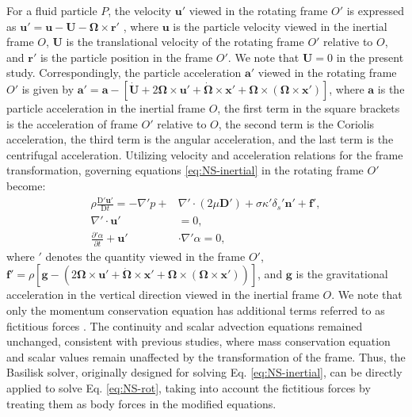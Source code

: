 \documentclass[final,3p,times,twocolumn,authoryear]{elsarticle}
\theoremstyle{definition}
\begin{document}
For a fluid particle $P$, the velocity $\mathbf{u}'$ viewed in the rotating frame $O'$ is expressed as $\mathbf{u}' = \mathbf{u} - \mathbf{U} - \mathbf{\Omega} \times \mathbf{r}'$ \citep{Kundu2015}, where $\mathbf{u}$ is the particle velocity viewed in the inertial frame $O$, $\mathbf{U}$ is the translational velocity of the rotating frame $O'$ relative to $O$, and $\mathbf{r}'$ is the particle position in the frame $O'$. We note that $\mathbf{U}=0$ in the present study. Correspondingly, the particle acceleration $\mathbf{a}'$ viewed in the rotating frame $O'$ is given by $\mathbf{a}' = \mathbf{a} - [\dot{\mathbf{U}} + 2\mathbf{\Omega}\times\mathbf{u}' + \dot{\mathbf{\Omega}}\times\mathbf{x}' + \mathbf{\Omega}\times(\mathbf{\Omega}\times\mathbf{x}')]$, where $\mathbf{a}$ is the particle acceleration in the inertial frame $O$, the first term in the square brackets is the acceleration of frame $O'$ relative to $O$, the second term is the Coriolis acceleration, the third term is the angular acceleration, and the last term is the centrifugal acceleration. Utilizing velocity and acceleration relations for the frame transformation, governing equations \eqref{eq:NS-inertial} in the rotating frame $O'$ become:
\begin{equation}
    \begin{split}
        \rho\frac{\mathrm{D}' \mathbf{u}'}{\mathrm{D} t} = -\nabla' p + & \nabla' \cdot \left( 2\mu\mathbf{D}'\right) + \sigma\kappa'\delta_s'\mathbf{n}' + \mathbf{f'}, \\
        \nabla' \cdot \mathbf{u}' & = 0, \\
        \frac{\partial' \alpha}{\partial t} + \mathbf{u}' & \cdot \nabla' \alpha = 0, \label{eq:NS-rot}
    \end{split}
\end{equation}
where $'$ denotes the quantity viewed in the frame $O'$, $\mathbf{f'} = \rho [\mathbf{g} - (2\mathbf{\Omega}\times\mathbf{u}' + \dot{\mathbf{\Omega}}\times\mathbf{x}' + \mathbf{\Omega} \times (\mathbf{\Omega} \times \mathbf{x}'))]$, and $\mathbf{g}$ is the gravitational acceleration in the vertical direction viewed in the inertial frame $O$. We note that only the momentum conservation equation has additional terms referred to as fictitious forces \citep{Kundu2015,Gledhill2016,Combrinck2017,Musehane2021}. The continuity and scalar advection equations remained unchanged, consistent with previous studies, where mass conservation equation \citep{Gledhill2016,Combrinck2017} and scalar values \citep{Gledhill2016,Combrinck2017,Musehane2021} remain unaffected by the transformation of the frame. Thus, the Basilisk solver, originally designed for solving Eq. \eqref{eq:NS-inertial}, can be directly applied to solve Eq. \eqref{eq:NS-rot}, taking into account the fictitious forces by treating them as body forces in the modified equations.
\end{document}
